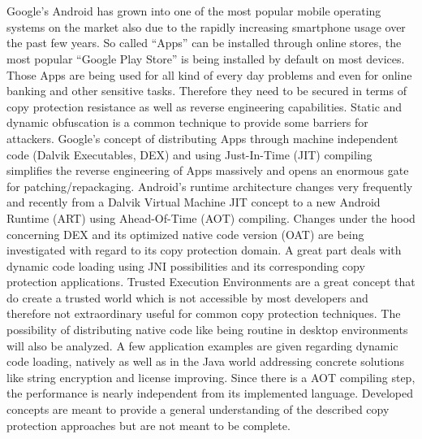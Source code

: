 \chapter*{\abstractname}
Google's Android has grown into one of the most popular mobile operating systems on the market also due to the rapidly increasing smartphone usage
over the past few years. So called ``Apps'' can be installed through
online stores, the most popular ``Google Play Store'' is being installed by default on most devices.
Those Apps are being used for all kind of every day problems and
even for online banking and other sensitive tasks. Therefore they need
to be secured in terms of copy protection resistance as well as reverse
engineering capabilities. Static and dynamic obfuscation is a common
technique to provide some barriers for attackers. Google's concept of
distributing Apps through machine independent code (Dalvik Executables, DEX) and using Just-In-Time (JIT) compiling simplifies the reverse engineering of Apps massively and opens an enormous gate for patching/repackaging. Android's runtime architecture changes very frequently and recently from a Dalvik Virtual Machine JIT concept to a new Android Runtime (ART) using Ahead-Of-Time (AOT) compiling. Changes under the hood concerning DEX and its optimized native code version (OAT) are being investigated with regard to its copy protection domain.
A great part deals with dynamic code loading using JNI possibilities and its
corresponding copy protection applications. Trusted Execution Environments
are a great concept that do create a trusted world which is not accessible
by most developers and therefore not extraordinary useful for common copy
protection techniques. The possibility of distributing native code like
being routine in desktop environments will also be analyzed. A few application
examples are given regarding dynamic code loading, natively as well as in the Java world addressing concrete solutions like string encryption and license
improving. Since there is a AOT compiling step, the performance is nearly
independent from its implemented language.
Developed concepts are meant to provide a general understanding of the described copy protection approaches but are not meant to be complete.
